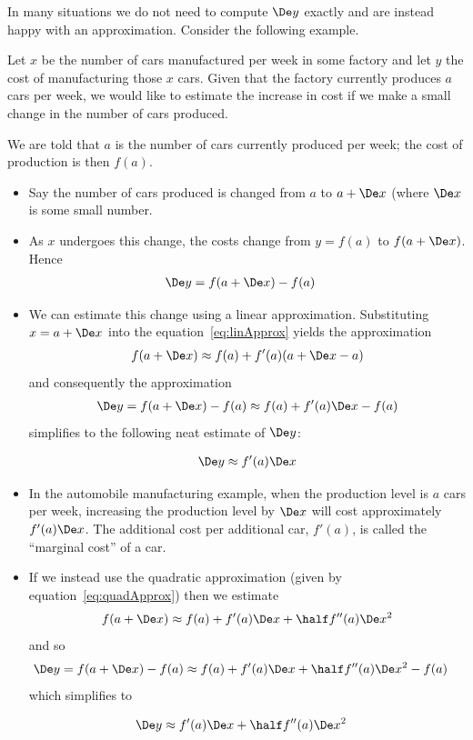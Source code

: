In many situations we do not need to compute $\De y$ exactly and are instead happy with
an approximation. Consider the following example.
\begin{eg}\label{eg_3_4_4}
Let $x$ be the number of cars manufactured per week in some factory and let $y$ the cost
of manufacturing those $x$ cars. Given that the factory currently produces $a$ cars per
week, we would like to estimate the increase in cost if we make a small change in the
number of cars produced.

\soln We are told that $a$ is the number of cars currently produced per week; the cost
of production  is then $f(a)$.
\begin{itemize}
 \item Say the number of cars produced is changed from $a$ to $a+\De x$ (where $\De x$
is some small number.
\item As $x$ undergoes this change, the costs change from $y=f(a)$ to $f(a+\De x)$.
Hence
\begin{align*}
  \De y &= f(a+\De x) - f(a)
\end{align*}
\item We can estimate this change using a linear approximation. Substituting
$x=a+\De x$ into the equation~\eqref{eq:linApprox} yields the approximation
\begin{align*}
f(a+\De x)\approx f(a)+f'(a)(a+\De x-a)
\end{align*}
and consequently the approximation
\begin{align*}
\De y=f(a+\De x)-f(a)\approx f(a)+f'(a)\De x-f(a)
\end{align*}
simplifies to the following neat estimate of $\De y$:
\begin{impeqn}\label{eq:lineDe}
\begin{align*}
    \De y\approx f'(a)\De x
\end{align*}
\end{impeqn}
\item In the automobile manufacturing example, when the production level is $a$ cars per
week, increasing the production level by $\De x$ will cost approximately
$f'(a)\De x$. The additional cost per additional car, $f'(a)$,  is called the ``marginal
cost'' of a car.

\item If we instead use the quadratic approximation (given by
equation~\eqref{eq:quadApprox}) then we estimate
\begin{align*}
f(a+\De x)\approx f(a)+f'(a)\De x+\half f''(a)\De x^2
\end{align*}
and so
\begin{align*}
\De y&=f(a+\De x)-f(a) \approx f(a)+f'(a)\De x +\half f''(a)\De x^2-f(a)
\end{align*}
which simplifies to
\begin{impeqn}\label{eq:quadDe}
\begin{align*}
  \De y &\approx f'(a)\De x+\half f''(a)\De x^2
\end{align*}
\end{impeqn}
\end{itemize}

\end{eg}

